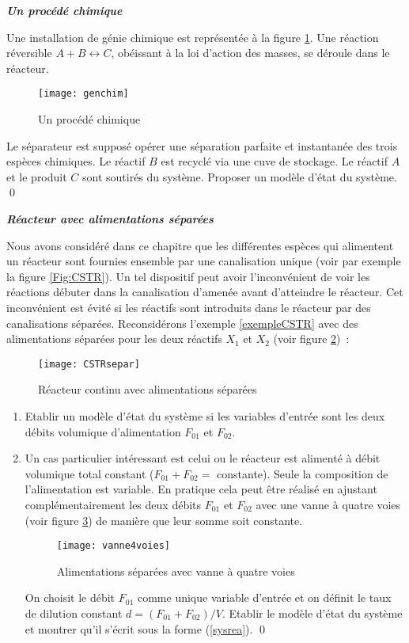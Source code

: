 \begin{exercice}{\bf \em Un procédé chimique}

Une installation de génie chimique est représentée à la figure
\ref{Fig:genchim}. Une réaction réversible $A+B \leftrightarrow C$, obéissant
à la loi d'action des masses, se déroule dans le réacteur.
\begin{figure}[htbp] 
   \centering
   \texttt{[image: genchim]} 
   \caption{Un procédé chimique}
   \label{Fig:genchim}
\end{figure}
 Le séparateur est
supposé opérer une séparation parfaite et instantanée des trois
espèces chimiques. Le réactif $B$ est recyclé via une cuve de
stockage. Le réactif $A$ et le produit $C$ sont soutirés du système.
Proposer un modèle d'état du système. \qed
\end{exercice}
\vv

\begin{exercice}{\bf \em Réacteur avec alimentations séparées}

Nous avons considéré dans ce chapitre que les différentes espèces qui alimentent un
réacteur sont fournies ensemble par une canalisation unique (voir par exemple la
figure \ref{Fig:CSTR}). Un tel dispositif peut avoir l'inconvénient de voir les
réactions débuter dans la canalisation d'amenée avant d'atteindre le réacteur. Cet
inconvénient est évité si les réactifs sont introduits dans le réacteur par des
canalisations séparées. Reconsidérons l'exemple \ref{exempleCSTR} avec des alimentations séparées pour
les deux réactifs $X_1$ et $X_2$ (voir figure \ref{Fig:CSTRsepar})~:
\begin{figure}[htbp] 
  \centering
   \texttt{[image: CSTRsepar]} 
   \caption{Réacteur continu avec alimentations séparées}
   \label{Fig:CSTRsepar}
\end{figure}
\begin{enumerate}
\item Etablir un modèle d'état du système si les variables d'entrée sont les deux débits volumique d'alimentation $F_{01}$ et $F_{02}$.
\item Un cas particulier intéressant est celui ou le réacteur
est alimenté à débit volumique total constant ($F_{01} + F_{02} =$ constante).
Seule la composition de l'alimentation est variable. En pratique cela peut être
réalisé en ajustant complémentairement les deux débits $F_{01}$ et $F_{02}$
avec une vanne à quatre voies (voir figure \ref{Fig:vanne4voies}) de manière
que leur somme soit constante.  
\begin{figure}[htbp] 
   \centering
   \texttt{[image: vanne4voies]} 
   \caption{Alimentations séparées avec vanne à quatre voies}
   \label{Fig:vanne4voies}
\end{figure}
On choisit le débit $F_{01}$
comme unique variable d'entrée et on définit le taux de dilution constant $d =
(F_{01} + F_{02})/V$. Etablir le modèle d'état du système et montrer qu'il s'écrit sous la forme (\ref{sysrea}). \qed
\end{enumerate}
\end{exercice}
\vv

